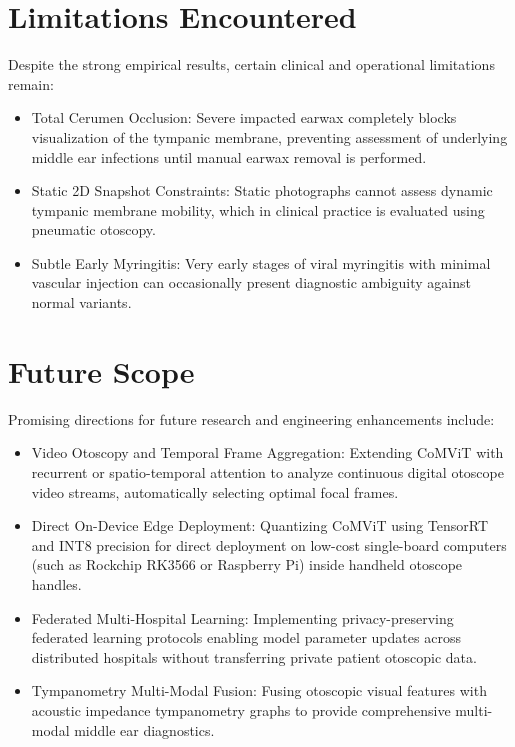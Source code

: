 \documentclass[12pt,a4paper]{report}
\renewcommand{\textbf}[1]{#1}
\begin{document}
\section{Limitations Encountered}
Despite the strong empirical results, certain clinical and operational limitations remain:
\begin{itemize}
    \item \textbf{Total Cerumen Occlusion:} Severe impacted earwax completely blocks visualization of the tympanic membrane, preventing assessment of underlying middle ear infections until manual earwax removal is performed.
    \item \textbf{Static 2D Snapshot Constraints:} Static photographs cannot assess dynamic tympanic membrane mobility, which in clinical practice is evaluated using pneumatic otoscopy.
    \item \textbf{Subtle Early Myringitis:} Very early stages of viral myringitis with minimal vascular injection can occasionally present diagnostic ambiguity against normal variants.
\end{itemize}

\section{Future Scope}
Promising directions for future research and engineering enhancements include:
\begin{itemize}
    \item \textbf{Video Otoscopy and Temporal Frame Aggregation:} Extending CoMViT with recurrent or spatio-temporal attention to analyze continuous digital otoscope video streams, automatically selecting optimal focal frames.
    \item \textbf{Direct On-Device Edge Deployment:} Quantizing CoMViT using TensorRT and INT8 precision for direct deployment on low-cost single-board computers (such as Rockchip RK3566 or Raspberry Pi) inside handheld otoscope handles.
    \item \textbf{Federated Multi-Hospital Learning:} Implementing privacy-preserving federated learning protocols enabling model parameter updates across distributed hospitals without transferring private patient otoscopic data.
    \item \textbf{Tympanometry Multi-Modal Fusion:} Fusing otoscopic visual features with acoustic impedance tympanometry graphs to provide comprehensive multi-modal middle ear diagnostics.
\end{itemize}
\end{document}
